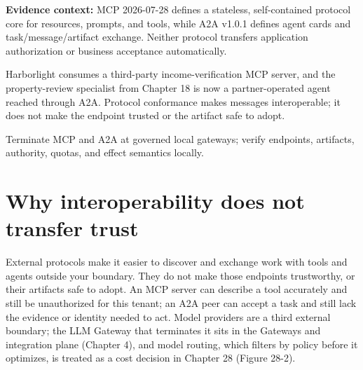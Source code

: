 

\begin{bookquote}

\textbf{Evidence context:} MCP 2026-07-28 defines a stateless, self-contained protocol core for resources, prompts, and tools, while A2A v1.0.1 defines agent cards and task/message/artifact exchange. Neither protocol transfers application authorization or business acceptance automatically. \textbf{}

\end{bookquote}

\begin{bookcallout}
Harborlight consumes a third-party income-verification MCP server, and the property-review specialist from Chapter 18 is now a partner-operated agent reached through A2A. Protocol conformance makes messages interoperable; it does not make the endpoint trusted or the artifact safe to adopt.
\end{bookcallout}

\begin{bookcallout}
Terminate MCP and A2A at governed local gateways; verify endpoints, artifacts, authority, quotas, and effect semantics locally.
\end{bookcallout}

\section{Why interoperability does not transfer trust}

External protocols make it easier to discover and exchange work with tools and agents outside your boundary. They do not make those endpoints trustworthy, or their artifacts safe to adopt. An MCP server can describe a tool accurately and still be unauthorized for this tenant; an A2A peer can accept a task and still lack the evidence or identity needed to act. Model providers are a third external boundary; the LLM Gateway that terminates it sits in the Gateways and integration plane (Chapter 4), and model routing, which filters by policy before it optimizes, is treated as a cost decision in Chapter 28 (Figure 28-2).\par

